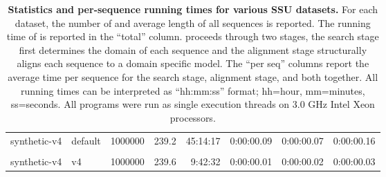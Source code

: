 \begin{table}[hb]
\begin{center}
\begin{tabular}{llrr|rrrr}
synthetic-v4    & default  & 1000000 &  239.2 &  45:14:17 &   0:00:00.09 &   0:00:00.07 &   0:00:00.16 \\
& & & & & & & \\
synthetic-v4    & v4       & 1000000 &  239.6 &   9:42:32 &   0:00:00.01 &   0:00:00.02 &   0:00:00.03 \\ 
\end{tabular}
\end{center}
\caption{\textbf{Statistics and  per-sequence running
    times for various SSU datasets.} For each dataset, the number of and average length of all
  sequences is reported. The running time of 
  is reported in the ``total'' column.  proceeds
  through two stages, the search stage first determines the domain of
  each sequence and the alignment stage structurally aligns each
  sequence to a domain specific model. The ``per seq'' columns report
  the average time per sequence for the search stage, alignment stage,
  and both together. 
  All running times can be interpreted as ``hh:mm:ss'' format;
  hh=hour, mm=minutes, ss=seconds. All programs were run as single
  execution threads on 3.0 GHz Intel Xeon processors.}
\label{tbl:ptimes}
\end{table}
